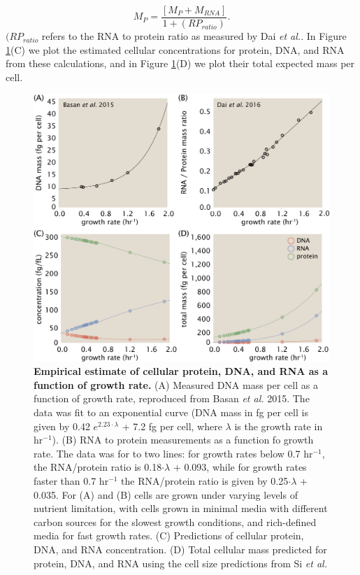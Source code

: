 \begin{equation}
	M_{P} = \frac{[M_P + M_{RNA}]}{1 + (RP_{ratio})}.
\end{equation}
$(RP_{ratio}$ refers to the RNA to protein ratio as measured by Dai \textit{et al.}. In Figure \ref{fig:schmidt_adjustment_varying_conc}(C) we plot the estimated cellular concentrations for protein, DNA, and RNA from these calculations, and in Figure \ref{fig:schmidt_adjustment_varying_conc}(D) we plot their total expected mass per cell.



\begin{figure}
		\centering
    \includegraphics[width=1\textwidth]{SI_figs/schmidt_estimate_protein_RNA_DNA_corrections.pdf}
  \caption{{\bf Empirical estimate of cellular protein, DNA, and RNA as a function of growth rate.} (A) Measured DNA mass per cell as a function of growth rate, reproduced from Basan \textit{et al.} 2015. The data was fit to an exponential curve (DNA mass in fg per cell is given by 0.42 $e^{2.23 \cdot \lambda}$ + 7.2 fg per cell, where $\lambda$ is the growth rate in hr$^{-1}$). (B) RNA to protein measurements as a function fo growth rate. The data was for to two lines: for growth rates below 0.7 hr$^{-1}$, the RNA/protein ratio is 0.18$\cdot \lambda$ + 0.093, while for growth rates faster than 0.7 hr$^{-1}$ the RNA/protein ratio is given by 0.25$\cdot \lambda$ + 0.035. For (A) and (B)
cells are grown under varying levels of nutrient limitation, with cells grown in minimal media with different carbon sources for the slowest growth conditions, and rich-defined media for fast growth rates. (C) Predictions of
cellular protein, DNA, and RNA concentration. (D) Total cellular mass predicted for protein, DNA, and RNA using the cell size predictions from Si \textit{et al.}
	 	}
  \label{fig:schmidt_adjustment_varying_conc}
\end{figure}


